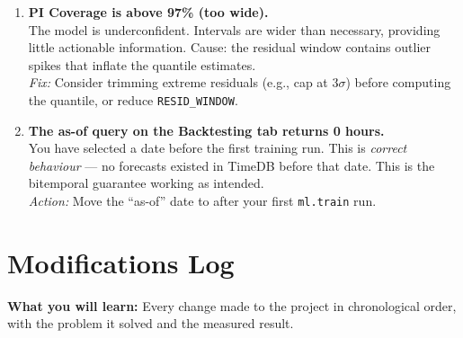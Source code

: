 \documentclass[12pt, a4paper, oneside]{memoir}
\newcommand{\code}[1]{\texttt{\footnotesize #1}}
\begin{document}
\begin{enumerate}[leftmargin=*, label=\textbf{Scenario \arabic*.}]
\item \textbf{PI Coverage is above 97\% (too wide).}\\
  The model is underconfident. Intervals are wider than necessary, providing little
  actionable information. Cause: the residual window contains outlier spikes that
  inflate the quantile estimates.\\
  \textit{Fix:} Consider trimming extreme residuals (e.g., cap at 3$\sigma$) before
  computing the quantile, or reduce \code{RESID\_WINDOW}.

\item \textbf{The as-of query on the Backtesting tab returns 0 hours.}\\
  You have selected a date before the first training run. This is \emph{correct
  behaviour} --- no forecasts existed in TimeDB before that date. This is the
  bitemporal guarantee working as intended.\\
  \textit{Action:} Move the ``as-of'' date to after your first \code{ml.train} run.

\end{enumerate}

\chapter{Modifications Log}\label{ch:modlog}

\begin{chapterintro}
\sffamily\small\textbf{What you will learn:} Every change made to the project in
chronological order, with the problem it solved and the measured result.
\end{chapterintro}
\end{document}
